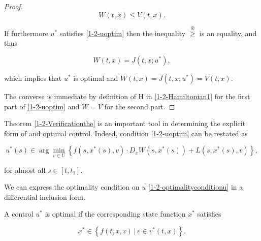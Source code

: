 \begin{theorem}
\begin{proof}
        \[W(t,x) \leq V(t,x).\]

        If furthermore $u^{\ast}$ satisfies \eqref{1-2-uoptim} then the inequality $\overset{\circledast}{\geq}$ is an equality, and thus

        \[W(t,x) = J(t,x;u^{\ast}),\]

        which implies that $u^{\ast}$ is optimal and $W(t,x)=J(t,x;u^{\ast})=V(t,x)$.

        The converse is immediate by definition of H in \eqref{1-2-Hamiltonian1} for the first part of \eqref{1-2-uoptim} and $W=V$ for the second part.

    \end{proof} 
\end{theorem}


Theorem \ref{1-2-Verificationthe} is an important tool in determining the explicit form of and optimal control. 
Indeed, condition \eqref{1-2-uoptim} can be restated as

\begin{equation}\label{1-2-optimalityconditionu}
        u^{\ast}(s) \in \arg\min_{v\in U} \left\{ f(s,x^{\ast}(s),v) \cdot D_xW(s,x^{\ast}(s)) + L(s,x^{\ast}(s),v)\right\},
\end{equation}

for almost all $s\in[t,t_1]$.

We can express the optimality condition on $u$ \eqref{1-2-optimalityconditionu} in a differential inclusion form. 

\begin{corollary}
    A control $u^{\ast}$ is optimal if the corresponding state function $x^{\ast}$ satisfies

    \begin{equation}
        x^{\ast} \in \left\{f(t,x,v) \,|\, v\in v^{\ast}(t,x)\right\}.
    \end{equation}
\end{corollary}